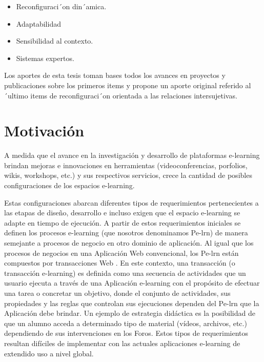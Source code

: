 \begin{itemize}
\begin{itemize}
 \item Reconfiguraci´on din´amica.
 \item Adaptabilidad
 \item Sensibilidad al contexto.
 \item Sistemas expertos.
\end{itemize}

\end{itemize}


Los aportes de esta tesis toman bases todos los avances en proyectos y
publicaciones sobre los primeros items y propone un aporte original referido al
´ultimo items de reconfiguraci´on orientada a las relaciones intersujetivas.



\section{Motivación}


A medida que el avance en la investigación y desarrollo de plataformas
e-learning brindan mejoras e innovaciones en herramientas (videoconferencias,
porfolios, wikis, workshops, etc.) y sus respectivos servicios, crece la
cantidad de posibles configuraciones de los espacios e-learning.


Estas configuraciones abarcan diferentes tipos de requerimientos pertenecientes
a las  etapas de diseño, desarrollo e incluso exigen que el espacio e-learning
se adapte en tiempo de ejecución. A partir de estos requerimientos iniciales se
definen los procesos e-learning (que nosotros denominamos Pe-lrn)
\cite{cacic2007.7} de manera semejante a procesos de negocio en otro dominio de
aplicación. Al igual que los
procesos de negocios en una Aplicación Web convencional, los Pe-lrn están
compuestos por transacciones Web \cite{cacic2007.7}. En este contexto, una
transacción (o transacción e-learning) es definida como una secuencia de
actividades que un usuario ejecuta a través de una Aplicación e-learning con el
propósito de efectuar una tarea o concretar un objetivo, donde el conjunto de
actividades, sus propiedades y las reglas que controlan sus ejecuciones dependen
del Pe-lrn que la Aplicación debe brindar. Un ejemplo de estrategia didáctica es
la posibilidad de que un alumno acceda a determinado tipo de material (vídeos,
archivos, etc.) dependiendo de sus intervenciones en los Foros. Estos tipos de
requerimientos resultan difíciles de implementar con las actuales aplicaciones
e-learning de extendido uso a nivel global.


